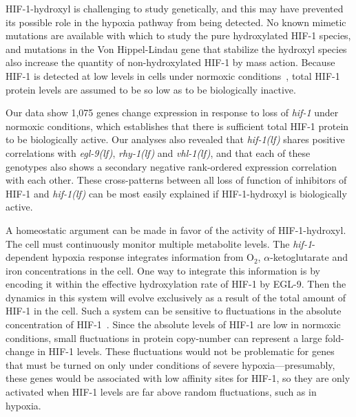\documentclass[9pt,twocolumn,twoside]{pnas-new}
\newcommand{\gene}[1]{\mbox{\emph{#1}}}
\newcommand{\egl}{\gene{egl-9(lf)}}
\newcommand{\rhy}{\gene{rhy-1(lf)}}
\newcommand{\vhl}{\gene{vhl-1(lf)}}
\newcommand{\hif}{\gene{hif-1(lf)}}
\newcommand{\eglp}{EGL-9}
\newcommand{\hifp}{HIF-1}
\newcommand{\hifn}{1,075}
\begin{document}
\hifp{}-hydroxyl is challenging to study genetically, and this may have
prevented its possible role in the hypoxia pathway from being detected. No known
mimetic mutations are available with which to study the pure hydroxylated
\hifp{} species, and mutations in the Von Hippel-Lindau gene that stabilize the
hydroxyl species also increase the quantity of non-hydroxylated \hifp{} by mass
action. Because \hifp{} is detected at low levels in cells under normoxic
conditions~\cite{Wang1993}, total \hifp{} protein levels are assumed to be so
low as to be biologically inactive.

Our data show \hifn{} genes change expression in response to loss of
\gene{hif-1} under normoxic conditions, which establishes that there is
sufficient total \hifp{} protein to be biologically active. Our analyses also
revealed that \hif{} shares positive correlations with \egl{}, \rhy{} and
\vhl{}, and that each of these genotypes also shows a secondary negative
rank-ordered expression correlation with each other. These cross-patterns
between all loss of function of inhibitors of \hifp{} and \hif{} can be most
easily explained if \hifp{}-hydroxyl is biologically active.

A homeostatic argument can be made in favor of the activity of \hifp{}-hydroxyl.
The cell must continuously monitor multiple metabolite levels. The
\gene{hif-1}-dependent hypoxia response integrates information from O$_2$,
$\alpha$-ketoglutarate and iron concentrations in the cell. One
way to integrate this information is by encoding it within the effective
hydroxylation rate of \hifp{} by \eglp{}. Then the dynamics in this system will
evolve exclusively as a result of the total amount of \hifp{} in the cell. Such
a system can be sensitive to fluctuations in the absolute concentration of
\hifp{}~\cite{Goentoro2009a}. Since the absolute levels of \hifp{} are low in
normoxic conditions, small fluctuations in protein copy-number can represent a
large fold-change in \hifp{} levels. These fluctuations would not be problematic
for genes that must be turned on only under conditions of severe
hypoxia---presumably, these genes would be associated with low affinity sites
for \hifp{}, so they are only activated when \hifp{} levels are far above
random fluctuations, such as in hypoxia.
\end{document}
